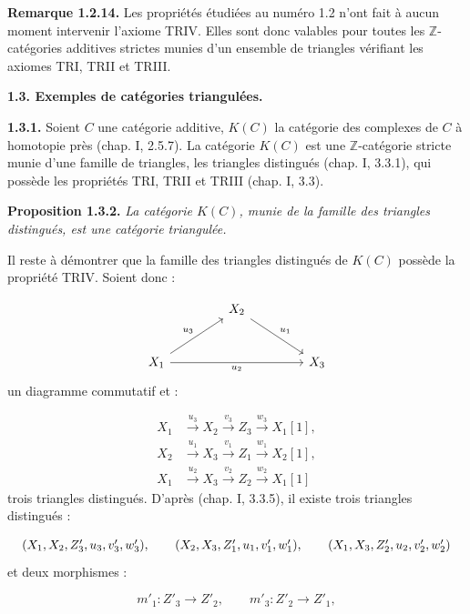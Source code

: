 \clearpage
{}%
\begingroup
\small
\setlength{\emergencystretch}{1.5em}%
\setlength{\abovedisplayskip}{4pt plus 2pt minus 2pt}%
\setlength{\belowdisplayskip}{4pt plus 2pt minus 2pt}%

\noindent\textbf{Remarque 1.2.14.}\quad
Les propriétés étudiées au numéro 1.2 n'ont fait à aucun moment intervenir
l'axiome TRIV. Elles sont donc valables pour toutes les $\mathbb Z$-catégories
additives strictes munies d'un ensemble de triangles vérifiant les axiomes
TRI, TRII et TRIII.

\medskip
\noindent\textbf{1.3. Exemples de catégories triangulées.}

\medskip
\noindent\textbf{1.3.1.}\quad
Soient $C$ une catégorie additive, $K(C)$ la catégorie des complexes de $C$
à homotopie près (chap. I, 2.5.7). La catégorie $K(C)$ est une
$\mathbb Z$-catégorie stricte munie d'une famille de triangles, les triangles
distingués (chap. I, 3.3.1), qui possède les propriétés TRI, TRII et TRIII
(chap. I, 3.3).

\medskip
\noindent\textbf{Proposition 1.3.2.}\quad
\textit{La catégorie $K(C)$, munie de la famille des triangles distingués,
est une catégorie triangulée.}

Il reste à démontrer que la famille des triangles distingués de $K(C)$
possède la propriété TRIV. Soient donc :

\[
  \begin{tikzcd}[column sep=4.2em,row sep=2.6em]
    & X_2 \arrow[dr,"u_1"] & \\
    X_1 \arrow[ur,"u_3"] \arrow[rr,"u_2"'] && X_3
  \end{tikzcd}
\]
\noindent un diagramme commutatif et :

\[
  \begin{aligned}
    X_1&\xrightarrow{u_3}X_2\xrightarrow{v_3}Z_3
      \xrightarrow{w_3}X_1[1],\\
    X_2&\xrightarrow{u_1}X_3\xrightarrow{v_1}Z_1
      \xrightarrow{w_1}X_2[1],\\
    X_1&\xrightarrow{u_2}X_3\xrightarrow{v_2}Z_2
      \xrightarrow{w_2}X_1[1]
  \end{aligned}
\]
\noindent trois triangles distingués. D'après (chap. I, 3.3.5), il existe
trois triangles distingués :

\[
  \resizebox{0.98\linewidth}{!}{$
    (X_1,X_2,Z'_3,u_3,v'_3,w'_3),\qquad
    (X_2,X_3,Z'_1,u_1,v'_1,w'_1),\qquad
    (X_1,X_3,Z'_2,u_2,v'_2,w'_2)
  $}
\]
\noindent et deux morphismes :

\[
  m'_1\colon Z'_3\longrightarrow Z'_2,\qquad
  m'_3\colon Z'_2\longrightarrow Z'_1,
\]
\endgroup
